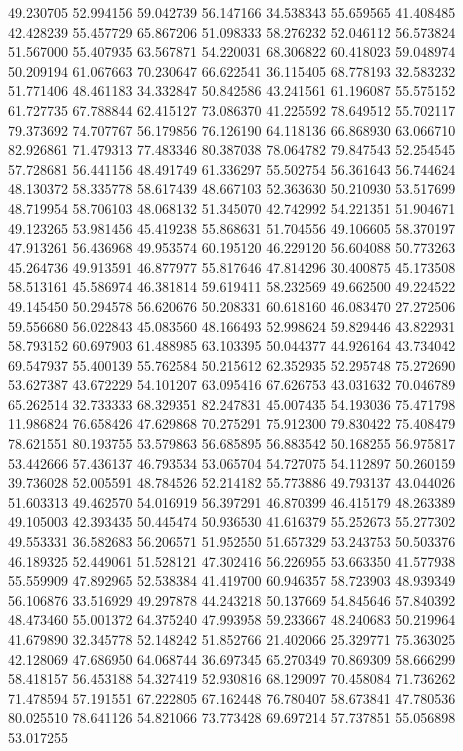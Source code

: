 49.230705
52.994156
59.042739
56.147166
34.538343
55.659565
41.408485
42.428239
55.457729
65.867206
51.098333
58.276232
52.046112
56.573824
51.567000
55.407935
63.567871
54.220031
68.306822
60.418023
59.048974
50.209194
61.067663
70.230647
66.622541
36.115405
68.778193
32.583232
51.771406
48.461183
34.332847
50.842586
43.241561
61.196087
55.575152
61.727735
67.788844
62.415127
73.086370
41.225592
78.649512
55.702117
79.373692
74.707767
56.179856
76.126190
64.118136
66.868930
63.066710
82.926861
71.479313
77.483346
80.387038
78.064782
79.847543
52.254545
57.728681
56.441156
48.491749
61.336297
55.502754
56.361643
56.744624
48.130372
58.335778
58.617439
48.667103
52.363630
50.210930
53.517699
48.719954
58.706103
48.068132
51.345070
42.742992
54.221351
51.904671
49.123265
53.981456
45.419238
55.868631
51.704556
49.106605
58.370197
47.913261
56.436968
49.953574
60.195120
46.229120
56.604088
50.773263
45.264736
49.913591
46.877977
55.817646
47.814296
30.400875
45.173508
58.513161
45.586974
46.381814
59.619411
58.232569
49.662500
49.224522
49.145450
50.294578
56.620676
50.208331
60.618160
46.083470
27.272506
59.556680
56.022843
45.083560
48.166493
52.998624
59.829446
43.822931
58.793152
60.697903
61.488985
63.103395
50.044377
44.926164
43.734042
69.547937
55.400139
55.762584
50.215612
62.352935
52.295748
75.272690
53.627387
43.672229
54.101207
63.095416
67.626753
43.031632
70.046789
65.262514
32.733333
68.329351
82.247831
45.007435
54.193036
75.471798
11.986824
76.658426
47.629868
70.275291
75.912300
79.830422
75.408479
78.621551
80.193755
53.579863
56.685895
56.883542
50.168255
56.975817
53.442666
57.436137
46.793534
53.065704
54.727075
54.112897
50.260159
39.736028
52.005591
48.784526
52.214182
55.773886
49.793137
43.044026
51.603313
49.462570
54.016919
56.397291
46.870399
46.415179
48.263389
49.105003
42.393435
50.445474
50.936530
41.616379
55.252673
55.277302
49.553331
36.582683
56.206571
51.952550
51.657329
53.243753
50.503376
46.189325
52.449061
51.528121
47.302416
56.226955
53.663350
41.577938
55.559909
47.892965
52.538384
41.419700
60.946357
58.723903
48.939349
56.106876
33.516929
49.297878
44.243218
50.137669
54.845646
57.840392
48.473460
55.001372
64.375240
47.993958
59.233667
48.240683
50.219964
41.679890
32.345778
52.148242
51.852766
21.402066
25.329771
75.363025
42.128069
47.686950
64.068744
36.697345
65.270349
70.869309
58.666299
58.418157
56.453188
54.327419
52.930816
68.129097
70.458084
71.736262
71.478594
57.191551
67.222805
67.162448
76.780407
58.673841
47.780536
80.025510
78.641126
54.821066
73.773428
69.697214
57.737851
55.056898
53.017255
